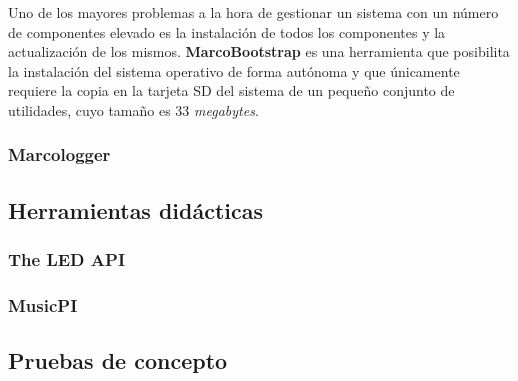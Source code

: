 Uno de los mayores problemas a la hora de gestionar un sistema con un número de componentes elevado es la instalación de todos los componentes y la actualización de los mismos. \textbf{MarcoBootstrap} es una herramienta que posibilita la instalación del sistema operativo de forma autónoma y que únicamente requiere la copia en la tarjeta SD del sistema de un pequeño conjunto de utilidades, cuyo tamaño es 33 \textit{megabytes}.


\subsubsection{Marcologger}
\subsection{Herramientas didácticas}

\subsubsection{The LED API}

\subsubsection{MusicPI}


\subsection{Pruebas de concepto}

